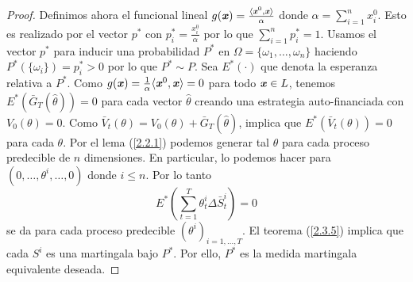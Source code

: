 \begin{proof}
	Definimos ahora el funcional lineal $ g(\textbf{\emph{x}}) = \frac{\langle \textbf{\emph{x}}^0, \textbf{\emph{x}}\rangle}{\alpha} $ donde $ \alpha = \sum_{i=1}^{n} x^0_i$. Esto es realizado por el vector $ p^* $ con $ p^*_i = \frac{x_i^0}{\alpha} $ por lo que $ \sum_{i=1}^{n} p^*_i = 1 $. Usamos el vector $ p^* $ para inducir una probabilidad $ P^* $ en $ \Omega = \{\omega_1,\dots,\omega_n\} $ haciendo $ P^*(\{\omega_i\}) = p^*_{i} > 0 $ por lo que $ P^* \sim P $. Sea $ E^*(\cdot) $ que denota la esperanza relativa a $ P^* $. Como $ g(\textbf{\emph{x}}) = \frac{1}{\alpha}\langle \textbf{\emph{x}}^0,\textbf{\emph{x}}\rangle = 0$ para todo $ \textbf{\emph{x}}\in L $, tenemos $ E^*(\bar{G}_T (\hat{\theta})) = 0$ para cada vector $ \hat{\theta} $ creando una estrategia auto-financiada con $ V_0(\theta) = 0 $. Como $ \bar{V}_t (\theta) = V_0(\theta) + \bar{G}_T (\hat{\theta})$, implica que $ E^*(\bar{V}_t (\theta)) = 0 $ para cada $ \theta $. Por el lema (\ref{2.2.1}) podemos generar tal $ \theta $ para cada proceso predecible de $ n $ dimensiones. En particular, lo podemos hacer para $ (0,\dots, \theta^i,\dots,0) $ donde $ i\leq n $. Por lo tanto
	\[
	E^*(\sum_{t=1}^{T}\theta_t^i\Delta \bar{S}^i_t) = 0
	\]
	se da para cada proceso predecible $ (\theta^i)_{i=1,\dots,T} $. El teorema (\ref{2.3.5}) implica que cada $ S^i $ es una martingala bajo $ P^* $. Por ello, $ P^* $ es la medida martingala equivalente deseada.
\end{proof}